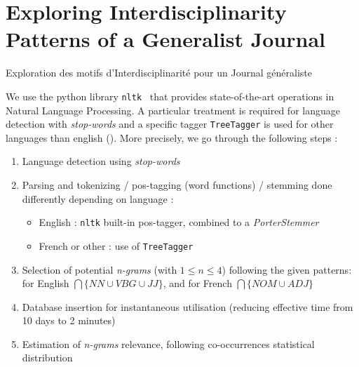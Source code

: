 


\newpage

\section{Exploring Interdisciplinarity Patterns of a Generalist Journal}{Exploration des motifs d'Interdisciplinarité pour un Journal généraliste}

\label{app:sec:cybergeo}







We use the python library \texttt{nltk}~\cite{bird2006nltk} that provides state-of-the-art operations in Natural Language Processing. A particular treatment is required for language detection with \emph{stop-words} and a specific tagger \texttt{TreeTagger} is used for other languages than english (\cite{schmid1994probabilistic}). More precisely, we go through the following steps :


\begin{enumerate}
\item Language detection using \textit{stop-words}
\item Parsing and tokenizing / pos-tagging (word functions) / stemming done differently depending on language :
\begin{itemize}
\item English : \texttt{nltk} built-in pos-tagger, combined to a \emph{PorterStemmer}
\item French or other : use of \texttt{TreeTagger}~\cite{schmid1994probabilistic}
\end{itemize}
\item Selection of potential \textit{n-grams} (with $1 \leq n \leq 4$) following the given patterns: for English $\bigcap \{NN \cup VBG \cup JJ \}$, and for French $\bigcap \{NOM \cup ADJ\}$
\item Database insertion for instantaneous utilisation (reducing effective time from 10 days to 2 minutes)
\item Estimation of \textit{n-grams} relevance, following co-occurrences statistical distribution
\end{enumerate}




